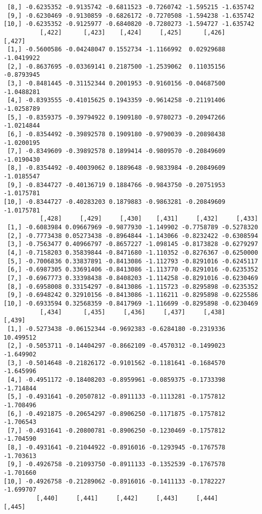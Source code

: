 \documentclass[
  letterpaper,
  DIV=11,
  numbers=noendperiod]{scrreprt}
\begin{document}
\begin{verbatim}
 [8,] -0.6235352 -0.9135742 -0.6811523 -0.7260742 -1.595215 -1.635742
 [9,] -0.6230469 -0.9130859 -0.6826172 -0.7270508 -1.594238 -1.635742
[10,] -0.6235352 -0.9125977 -0.6840820 -0.7280273 -1.594727 -1.635742
          [,422]      [,423]    [,424]     [,425]      [,426]     [,427]
 [1,] -0.5600586 -0.04248047 0.1552734 -1.1166992  0.02929688 -1.0419922
 [2,] -0.8637695 -0.03369141 0.2187500 -1.2539062  0.11035156 -0.8793945
 [3,] -0.8481445 -0.31152344 0.2001953 -0.9160156 -0.04687500 -1.0488281
 [4,] -0.8393555 -0.41015625 0.1943359 -0.9614258 -0.21191406 -1.0258789
 [5,] -0.8359375 -0.39794922 0.1909180 -0.9780273 -0.20947266 -1.0214844
 [6,] -0.8354492 -0.39892578 0.1909180 -0.9790039 -0.20898438 -1.0200195
 [7,] -0.8349609 -0.39892578 0.1899414 -0.9809570 -0.20849609 -1.0190430
 [8,] -0.8354492 -0.40039062 0.1889648 -0.9833984 -0.20849609 -1.0185547
 [9,] -0.8344727 -0.40136719 0.1884766 -0.9843750 -0.20751953 -1.0175781
[10,] -0.8344727 -0.40283203 0.1879883 -0.9863281 -0.20849609 -1.0175781
          [,428]     [,429]     [,430]    [,431]     [,432]     [,433]
 [1,] -0.6083984 0.09667969 -0.9877930 -1.149902 -0.7758789 -0.5278320
 [2,] -0.7773438 0.05273438 -0.8964844 -1.143066 -0.8232422 -0.6308594
 [3,] -0.7563477 0.40966797 -0.8657227 -1.098145 -0.8173828 -0.6279297
 [4,] -0.7158203 0.35839844 -0.8471680 -1.110352 -0.8276367 -0.6250000
 [5,] -0.7006836 0.33837891 -0.8413086 -1.112793 -0.8291016 -0.6245117
 [6,] -0.6987305 0.33691406 -0.8413086 -1.113770 -0.8291016 -0.6235352
 [7,] -0.6967773 0.33398438 -0.8408203 -1.114258 -0.8291016 -0.6230469
 [8,] -0.6958008 0.33154297 -0.8413086 -1.115723 -0.8295898 -0.6235352
 [9,] -0.6948242 0.32910156 -0.8413086 -1.116211 -0.8295898 -0.6225586
[10,] -0.6933594 0.32568359 -0.8417969 -1.116699 -0.8295898 -0.6230469
          [,434]      [,435]     [,436]     [,437]     [,438]    [,439]
 [1,] -0.5273438 -0.06152344 -0.9692383 -0.6284180 -0.2319336 10.499512
 [2,] -0.5053711 -0.14404297 -0.8662109 -0.4570312 -0.1499023 -1.649902
 [3,] -0.5014648 -0.21826172 -0.9101562 -0.1181641 -0.1684570 -1.645996
 [4,] -0.4951172 -0.18408203 -0.8959961 -0.0859375 -0.1733398 -1.714844
 [5,] -0.4931641 -0.20507812 -0.8911133 -0.1113281 -0.1757812 -1.708496
 [6,] -0.4921875 -0.20654297 -0.8906250 -0.1171875 -0.1757812 -1.706543
 [7,] -0.4931641 -0.20800781 -0.8906250 -0.1230469 -0.1757812 -1.704590
 [8,] -0.4931641 -0.21044922 -0.8916016 -0.1293945 -0.1767578 -1.703613
 [9,] -0.4926758 -0.21093750 -0.8911133 -0.1352539 -0.1767578 -1.701660
[10,] -0.4926758 -0.21289062 -0.8916016 -0.1411133 -0.1782227 -1.699707
         [,440]     [,441]     [,442]     [,443]     [,444]      [,445]

\end{verbatim}
\end{document}
